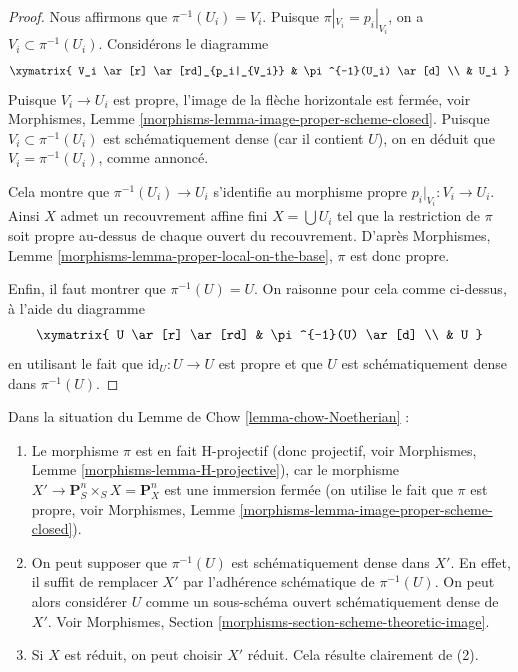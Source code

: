 \begin{proof}
\medskip\noindent
Nous affirmons que $\pi^{-1}(U_i) = V_i$.
Puisque $\pi|_{V_i} = p_i|_{V_i}$, on a
$V_i \subset \pi^{-1}(U_i)$. Considérons le diagramme
$$
\xymatrix{
V_i \ar[r] \ar[rd]_{p_i|_{V_i}} & \pi^{-1}(U_i) \ar[d] \\
& U_i
}
$$
Puisque $V_i \to U_i$ est propre, l'image de
la flèche horizontale est fermée, voir
Morphismes, Lemme \ref{morphisms-lemma-image-proper-scheme-closed}.
Puisque $V_i \subset \pi^{-1}(U_i)$ est schématiquement
dense (car il contient $U$),
on en déduit que $V_i = \pi^{-1}(U_i)$, comme annoncé.

\medskip\noindent
Cela montre que $\pi^{-1}(U_i) \to U_i$ s'identifie au morphisme
propre $p_i|_{V_i} : V_i \to U_i$. Ainsi $X$ admet un
recouvrement affine fini $X = \bigcup U_i$ tel que la restriction
de $\pi$ soit propre au-dessus de chaque ouvert du recouvrement.
D'après Morphismes, Lemme \ref{morphisms-lemma-proper-local-on-the-base},
$\pi$ est donc propre.

\medskip\noindent
Enfin, il faut montrer que $\pi^{-1}(U) = U$. On raisonne pour cela
comme ci-dessus, à l'aide du diagramme
$$
\xymatrix{
U \ar[r] \ar[rd] & \pi^{-1}(U) \ar[d] \\
& U
}
$$
en utilisant le fait que $\text{id}_U : U \to U$ est propre et que
$U$ est schématiquement dense dans $\pi^{-1}(U)$.
\end{proof}

\begin{remark}
\label{remark-chow-Noetherian}
Dans la situation du
Lemme de Chow \ref{lemma-chow-Noetherian} :
\begin{enumerate}
\item Le morphisme $\pi$ est en fait H-projectif (donc projectif, voir
Morphismes, Lemme \ref{morphisms-lemma-H-projective}),
car le morphisme $X' \to \mathbf{P}^n_S \times_S X = \mathbf{P}^n_X$
est une immersion fermée (on utilise le fait que $\pi$ est propre, voir
Morphismes, Lemme \ref{morphisms-lemma-image-proper-scheme-closed}).
\item On peut supposer que $\pi^{-1}(U)$ est schématiquement dense
dans $X'$. En effet, il suffit de remplacer $X'$ par l'adhérence schématique
de $\pi^{-1}(U)$. On peut alors considérer $U$ comme un
sous-schéma ouvert schématiquement dense de $X'$.
Voir Morphismes, Section \ref{morphisms-section-scheme-theoretic-image}.
\item Si $X$ est réduit, on peut choisir $X'$ réduit. Cela résulte
clairement de (2).
\end{enumerate}
\end{remark}




